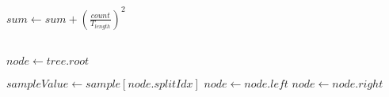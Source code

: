 \begin{center}
\begin{algorithmic}[1]
		\State $ sum \gets sum + (\frac{count}{T_{length}})^2 $
	\EndFor

	\State {}
\EndFunction
\\
	\State $ node \gets tree.root $

		\State $ sampleValue \gets sample[node.splitIdx] $
			\State $ node \gets node.left $
		\Else
			\State $ node \gets node.right $
		\EndIf
	\EndWhile

	\State {}
\EndFunction
	\end{algorithmic}
\end{center}
